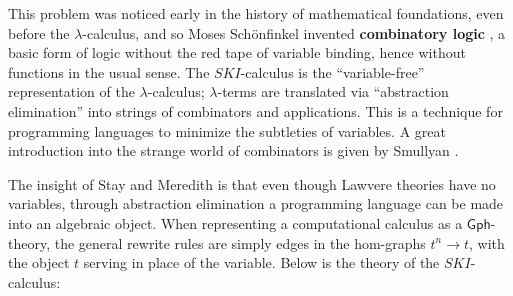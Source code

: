 \documentclass{amsart}
\theoremstyle{definition}
\newcommand{\Gph}{\mathsf{Gph}}
\begin{document}
This problem was noticed early in the history of mathematical foundations, even before the $\lambda$-calculus, and so Moses Sch\"onfinkel invented \textbf{combinatory logic} \cite{combs}, a basic form of logic without the red tape of variable binding, hence without functions in the usual sense. The $SKI$-calculus is the ``variable-free'' representation of the $\lambda$-calculus; $\lambda$-terms are translated via ``abstraction elimination'' into strings of combinators and applications. This is a technique for programming languages to minimize the subtleties of variables. A great introduction into the strange world of combinators is given by Smullyan \cite{tmam}.

The insight of Stay and Meredith \cite{roswelt} is that even though Lawvere theories have no variables, through abstraction elimination a programming language can be made into an algebraic object. When representing a computational calculus as a $\Gph$-theory, the general rewrite rules are simply edges in the hom-graphs $t^n \to t$, with the object $t$ serving in place of the variable. Below is the theory of the $SKI$-calculus:
\end{document}
